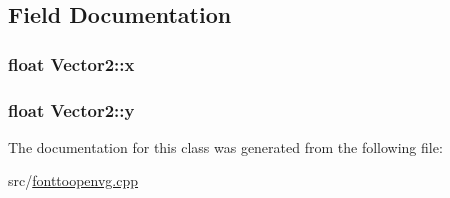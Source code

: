 \subsection{Field Documentation}
\hypertarget{classVector2_a046bb8d17a876acc49415128dc0502f2}{}
\subsubsection[{x}]{\setlength{\rightskip}{0pt plus 5cm}float Vector2\+::x}\label{classVector2_a046bb8d17a876acc49415128dc0502f2}
\hypertarget{classVector2_a0e07bad05f01ed811b909a2eef97f9e2}{}
\subsubsection[{y}]{\setlength{\rightskip}{0pt plus 5cm}float Vector2\+::y}\label{classVector2_a0e07bad05f01ed811b909a2eef97f9e2}


The documentation for this class was generated from the following file\+:\begin{DoxyCompactItemize}
\item 
src/\hyperlink{fonttoopenvg_8cpp}{fonttoopenvg.\+cpp}\end{DoxyCompactItemize}
